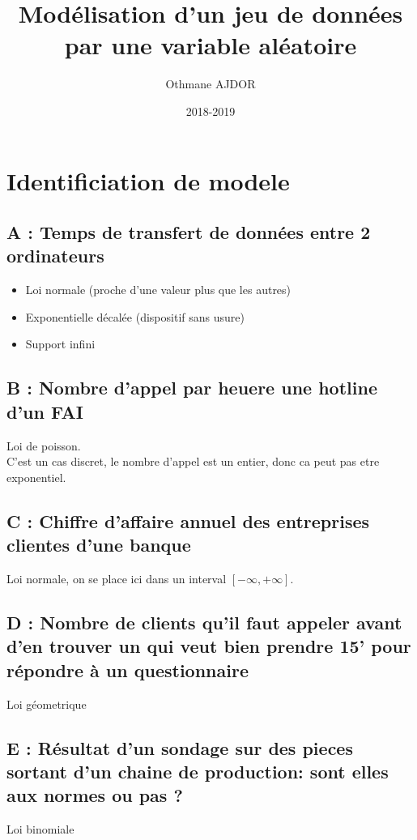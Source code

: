 \documentclass[11pt]{article}
\title{Modélisation d'un jeu de données par une variable aléatoire}
\author{Othmane AJDOR}
\date{2018-2019}
\begin{document}
\maketitle

\pagebreak

\tableofcontents

\pagebreak

\section{Identificiation de modele}

\subsection{A : Temps de transfert de données entre 2 ordinateurs}
\begin{itemize}
    \item Loi normale (proche d'une valeur plus que les autres)
    \item Exponentielle décalée (dispositif sans usure)
    \item Support infini
\end{itemize}

\subsection{B : Nombre d'appel par heuere une hotline d'un FAI}
Loi de poisson.\\
C'est un cas discret, le nombre d'appel est un entier, donc ca peut pas etre exponentiel.

\subsection{C : Chiffre d'affaire annuel des entreprises clientes d'une banque}
Loi normale, on se place ici dans un interval $[-\infty,+\infty]$.


\subsection{D : Nombre de clients qu'il faut appeler avant d'en trouver un qui veut bien prendre 15' pour répondre à un questionnaire}
Loi géometrique

\subsection{E : Résultat d'un sondage sur des pieces sortant d'un chaine de production: sont elles aux normes ou pas ?}
Loi binomiale
\end{document}
